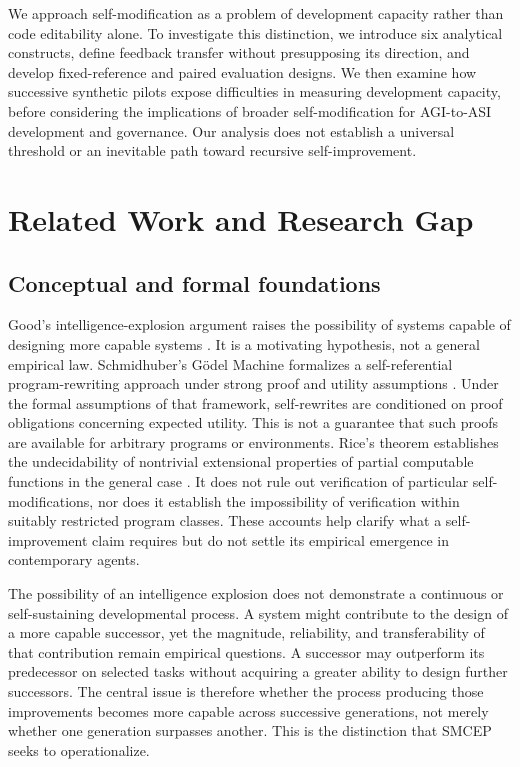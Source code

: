 \documentclass[11pt,a4paper]{article}
\begin{document}
We approach self-modification as a problem of development capacity rather than code editability alone. To investigate this distinction, we introduce six analytical constructs, define feedback transfer
without presupposing its direction, and develop fixed-reference and paired evaluation designs. We then examine how successive synthetic pilots expose difficulties in measuring development capacity, before considering the implications of broader self-modification for AGI-to-ASI development and governance.
Our analysis does not establish a universal threshold or an inevitable path toward recursive self-improvement.

\section{Related Work and Research Gap}
\subsection{Conceptual and formal foundations}
Good's intelligence-explosion argument raises the possibility of systems capable of designing more capable systems \cite{good1965}. It is a motivating hypothesis, not a general empirical law. Schmidhuber's G\"odel Machine formalizes a self-referential program-rewriting approach under strong proof and utility assumptions \cite{schmidhuber2006}. Under the formal assumptions of that framework, self-rewrites are conditioned on proof obligations concerning expected utility. This is not a guarantee that such proofs are available for arbitrary programs or environments. Rice's theorem establishes the undecidability of nontrivial extensional properties of partial computable functions in the general case \cite{rice1953}. It does not rule out verification of particular self-modifications, nor does it establish the impossibility of verification within suitably restricted program classes. These accounts help clarify what a self-improvement claim requires but do not settle its empirical emergence in contemporary agents.

The possibility of an intelligence explosion does not demonstrate a continuous or self-sustaining developmental process. A system might contribute to the design of a more capable successor, yet the magnitude, reliability, and transferability of that contribution remain empirical questions. A successor may outperform its predecessor on selected tasks without acquiring a greater ability to design further successors. The central issue is therefore whether the process producing those improvements becomes more capable across successive generations, not merely whether one generation surpasses another. This is the distinction that SMCEP seeks to operationalize.
\end{document}
